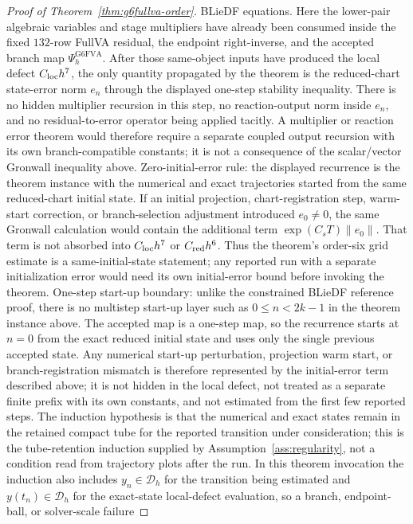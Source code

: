 \documentclass[preprint,12pt]{elsarticle}
\begin{document}
\begin{proof}[Proof of Theorem~\ref{thm:g6fullva-order}]
BLieDF equations.  Here the lower-pair algebraic variables and stage
multipliers have already been consumed inside the fixed \(132\)-row
FullVA residual, the endpoint right-inverse, and the accepted branch map
\(\Psi_h^{\mathrm{G6FVA}}\).  After those same-object inputs have produced
the local defect \(C_{\rm loc}h^7\), the only quantity propagated by the
theorem is the reduced-chart state-error norm \(e_n\) through the displayed
one-step stability inequality.  There is no hidden multiplier recursion in
this step, no reaction-output norm inside \(e_n\), and no residual-to-error
operator being applied tacitly.  A multiplier or reaction error theorem would
therefore require a separate coupled output recursion with its own
branch-compatible constants; it is not a consequence of the scalar/vector
Gronwall inequality above.
Zero-initial-error rule: the displayed recurrence is the theorem instance
with the numerical and exact trajectories started from the same reduced-chart
initial state.  If an initial projection, chart-registration step,
warm-start correction, or branch-selection adjustment introduced
\(e_0\ne0\), the same Gronwall calculation would contain the additional term
\(\exp(C_sT)\|e_0\|\).  That term is not absorbed into
\(C_{\rm loc}h^7\) or \(C_{\rm red}h^6\).  Thus the theorem's order-six grid
estimate is a same-initial-state statement; any reported run with a separate
initialization error would need its own initial-error bound before invoking
the theorem.
One-step start-up boundary: unlike the constrained BLieDF reference proof,
there is no multistep start-up layer such as \(0\le n<2k-1\) in the theorem
instance above.  The accepted map is a one-step map, so the recurrence starts
at \(n=0\) from the exact reduced initial state and uses only the single
previous accepted state.  Any numerical start-up perturbation, projection
warm start, or branch-registration mismatch is therefore represented by the
initial-error term described above; it is not hidden in the local defect,
not treated as a separate finite prefix with its own constants, and not
estimated from the first few reported steps.
The induction hypothesis is that the numerical and exact states remain in the
retained compact tube for the reported transition under consideration; this is
the tube-retention induction supplied by Assumption~\ref{ass:regularity}, not
a condition read from trajectory plots after the run. In this theorem
invocation the induction also includes \(y_n\in\mathcal D_h\) for the
transition being estimated and \(y(t_n)\in\mathcal D_h\) for the exact-state
local-defect evaluation, so a branch, endpoint-ball, or solver-scale failure

\end{proof}
\end{document}
